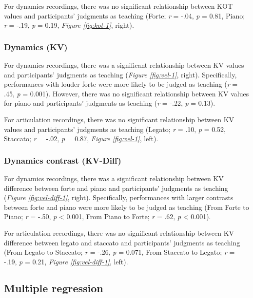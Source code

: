 \documentclass[
  man,floatsintext]{apa6}
\begin{document}
For dynamics recordings, there was no significant relationship between KOT values and participants' judgments as teaching (Forte; \emph{r} = -.04, \emph{p} = 0.81, Piano; \emph{r} = -.19, \emph{p} = 0.19, \emph{Figure \ref{fig:kot-1}}, right).

\hypertarget{dynamics-kv}{%
\subsubsection{Dynamics (KV)}\label{dynamics-kv}}

For dynamics recordings, there was a significant relationship between KV values and participants' judgments as teaching (\emph{Figure \ref{fig:vel-1}}, right). Specifically, performances with louder forte were more likely to be judged as teaching (\emph{r} = .45, \emph{p} = 0.001). However, there was no significant relationship between KV values for piano and participants' judgments as teaching (\emph{r} = -.22, \emph{p} = 0.13).

For articulation recordings, there was no significant relationship between KV values and participants' judgments as teaching (Legato; \emph{r} = .10, \emph{p} = 0.52, Staccato; \emph{r} = -.02, \emph{p} = 0.87, \emph{Figure \ref{fig:vel-1}}, left).

\hypertarget{dynamics-contrast-kv-diff}{%
\subsubsection{Dynamics contrast (KV-Diff)}\label{dynamics-contrast-kv-diff}}

For dynamics recordings, there was a significant relationship between KV difference between forte and piano and participants' judgments as teaching (\emph{Figure \ref{fig:vel-diff-1}}, right). Specifically, performances with larger contrasts between forte and piano were more likely to be judged as teaching (From Forte to Piano; \emph{r} = -.50, \emph{p} \textless{} 0.001, From Piano to Forte; \emph{r} = .62, \emph{p} \textless{} 0.001).

For articulation recordings, there was no significant relationship between KV difference between legato and staccato and participants' judgments as teaching (From Legato to Staccato; \emph{r} = -.26, \emph{p} = 0.071, From Staccato to Legato; \emph{r} = -.19, \emph{p} = 0.21, \emph{Figure \ref{fig:vel-diff-1}}, left).

\hypertarget{multiple-regression}{%
\subsection{Multiple regression}\label{multiple-regression}}
\end{document}
